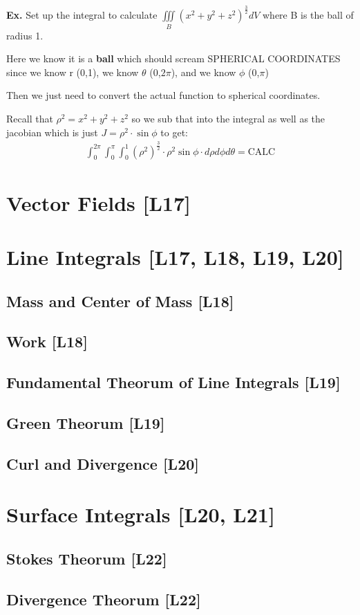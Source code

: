 \documentclass[12pt,letterpaper]{article} \usepackage{amsmath} \usepackage{graphicx} \usepackage[margin=1in]{geometry} \usepackage{longtable}  \usepackage{amssymb}
\begin{document}
	\begin{mdframed}[]
		\textbf{Ex. } Set up the integral to calculate $\iiint \limits_B \left(x^2+y^2+z^2\right)^{\frac{3}{2}} dV$ where B is the ball of radius 1.
		
		Here we know it is a \textbf{ball} which should scream SPHERICAL COORDINATES since we know r (0,1), we know $\theta$ (0,$2\pi$), and we know $\phi$ (0,$\pi$)
		
		Then we just need to convert the actual function to spherical coordinates. 
		
		Recall that $\rho^2 = x^2 + y^2 + z^2$ so we sub that into the integral as well as the jacobian which is just $J=\rho ^2 \cdot \sin\phi$ to get:
		\begin{align*}
			\int_0^{2\pi}\int_0^{\pi}\int_0^1\left(\rho^2\right)^{\frac{3}{2}} \cdot \rho^2\sin\phi \cdot d\rho d\phi d\theta = \text{CALC}
		\end{align*}
	\end{mdframed}

	\section{Vector Fields [L17]}
	
	\section{Line Integrals [L17, L18, L19, L20]}
	
	\subsection{Mass and Center of Mass [L18]}
	
	\subsection{Work [L18]}
	
	\subsection{Fundamental Theorum of Line Integrals [L19]}
	
	\subsection{Green Theorum [L19]}
	
	\subsection{Curl and Divergence [L20]}
	
	\section{Surface Integrals [L20, L21]}
	
	\subsection{Stokes Theorum [L22]}
	
	\subsection{Divergence Theorum [L22]}
	
\end{document}
